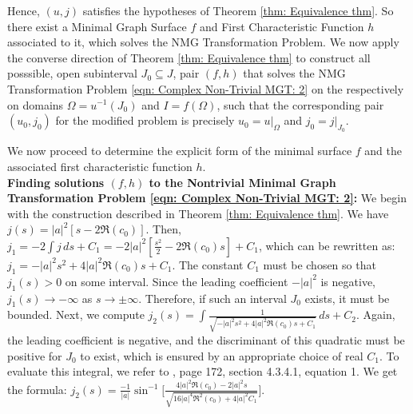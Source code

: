 \documentclass[12pt]{article}
\theoremstyle{plain}
\theoremstyle{definition}
\theoremstyle{remark}
\begin{document}
Hence, \((u, j)\) satisfies the hypotheses of Theorem \ref{thm: Equivalence thm}. So there exist a Minimal Graph Surface \(f\) and First Characteristic Function \(h\) associated to it, which solves the NMG Transformation Problem. We now apply the converse direction of Theorem \ref{thm: Equivalence thm} to construct all posssible, open subinterval \(J_0 \subseteq J\), pair \((f, h)\) that solves the NMG Transformation Problem \ref{eqn: Complex Non-Trivial MGT: 2} on the respectively on domains \(\Omega = u^{-1}(J_0)\) and \(I = f(\Omega)\), such that the corresponding pair \((u_0, j_0)\) for the modified problem is precisely \(u_0 = u|_{\Omega}\) and \(j_0 = j|_{J_0}\).


We now proceed to determine the explicit form of the minimal surface \(f\) and the associated first characteristic function \(h\).\\

\textbf{Finding solutions \((f,h)\) to the Nontrivial Minimal Graph Transformation Problem \ref{eqn: Complex Non-Trivial MGT: 2}:} We begin with the construction described in Theorem \ref{thm: Equivalence thm}. We have \(j(s) = |a|^2 [s - 2\Re(c_0)]\). Then, \(j_1 = -2\int j\, ds + C_1= -2|a|^2 \left[\frac{s^2}{2} - 2\Re(c_0)s\right] + C_1\), which can be rewritten as: \(j_1 = -|a|^2 s^2 + 4|a|^2 \Re(c_0) s + C_1\). The constant \(C_1\) must be chosen so that \(j_1(s) > 0\) on some interval. Since the leading coefficient \(-|a|^2\) is negative, \(j_1(s) \to -\infty\) as \(s \to \pm\infty\). Therefore, if such an interval \(J_0\) exists, it must be bounded. Next, we compute \(j_2(s) = \int \frac{1}{\sqrt{-|a|^2 s^2 + 4|a|^2 \Re(c_0) s + C_1}}\, ds + C_2\). Again, the leading coefficient is negative, and the discriminant of this quadratic must be positive for \(J_0\) to exist, which is ensured by an appropriate choice of real \(C_1\). To evaluate this integral, we refer to \cite{JD}, page 172, section 4.3.4.1, equation 1. We get the formula: \(j_2(s)=\frac{-1}{|a|} \sin^{-1}\big[ \frac{4|a|^2 \Re(c_0)-2|a|^2s}{\sqrt{16|a|^4 \Re^2(c_0)+4|a|^2 C_1}}\big]\).
\end{document}
